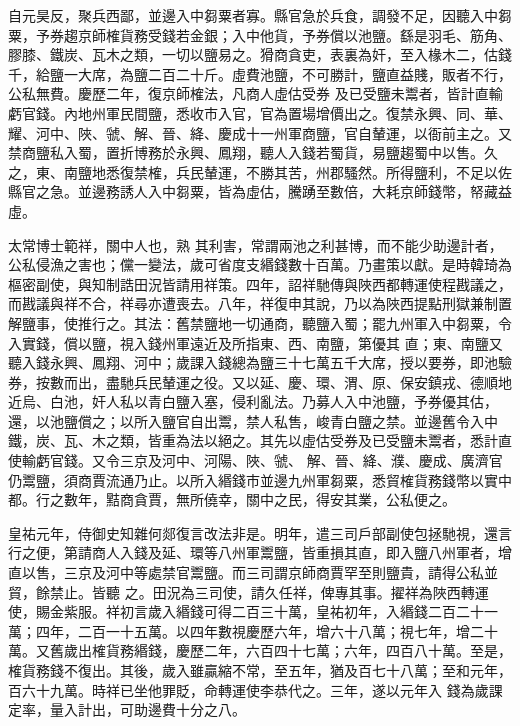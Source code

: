 \begin{pinyinscope}
 自元昊反，聚兵西鄙，並邊入中芻粟者寡。縣官急於兵食，調發不足，因聽入中芻粟，予券趨京師榷貨務受錢若金銀；入中他貨，予券償以池鹽。繇是羽毛、筋角、膠膝、鐵炭、瓦木之類，一切以鹽易之。猾商貪吏，表裏為奸，至入椽木二，估錢千，給鹽一大席，為鹽二百二十斤。虛費池鹽，不可勝計，鹽直益賤，販者不行，公私無費。慶歷二年，復京師榷法，凡商人虛估受券
 及已受鹽未鬻者，皆計直輸虧官錢。內地州軍民間鹽，悉收市入官，官為置場增價出之。復禁永興、同、華、耀、河中、陜、虢、解、晉、絳、慶成十一州軍商鹽，官自輦運，以衙前主之。又禁商鹽私入蜀，置折博務於永興、鳳翔，聽人入錢若蜀貨，易鹽趨蜀中以售。久之，東、南鹽地悉復禁榷，兵民輦運，不勝其苦，州郡騷然。所得鹽利，不足以佐縣官之急。並邊務誘人入中芻粟，皆為虛估，騰踴至數倍，大耗京師錢幣，帑藏益虛。



 太常博士範祥，關中人也，熟
 其利害，常謂兩池之利甚博，而不能少助邊計者，公私侵漁之害也；儻一變法，歲可省度支緡錢數十百萬。乃畫策以獻。是時韓琦為樞密副使，與知制誥田況皆請用祥策。四年，詔祥馳傳與陜西都轉運使程戡議之，而戡議與祥不合，祥尋亦遭喪去。八年，祥復申其說，乃以為陜西提點刑獄兼制置解鹽事，使推行之。其法：舊禁鹽地一切通商，聽鹽入蜀；罷九州軍入中芻粟，令入實錢，償以鹽，視入錢州軍遠近及所指東、西、南鹽，第優其
 直；東、南鹽又聽入錢永興、鳳翔、河中；歲課入錢總為鹽三十七萬五千大席，授以要券，即池驗券，按數而出，盡馳兵民輦運之役。又以延、慶、環、渭、原、保安鎮戎、德順地近烏、白池，奸人私以青白鹽入塞，侵利亂法。乃募人入中池鹽，予券優其估，還，以池鹽償之；以所入鹽官自出鬻，禁人私售，峻青白鹽之禁。並邊舊令入中鐵，炭、瓦、木之類，皆重為法以絕之。其先以虛估受券及已受鹽未鬻者，悉計直使輸虧官錢。又令三京及河中、河陽、陜、虢、
 解、晉、絳、濮、慶成、廣濟官仍鬻鹽，須商賈流通乃止。以所入緡錢市並邊九州軍芻粟，悉貿榷貨務錢幣以實中都。行之數年，黠商貪賈，無所僥幸，關中之民，得安其業，公私便之。



 皇祐元年，侍御史知雜何郯復言改法非是。明年，遣三司戶部副使包拯馳視，還言行之便，第請商人入錢及延、環等八州軍鬻鹽，皆重損其直，即入鹽八州軍者，增直以售，三京及河中等處禁官鬻鹽。而三司謂京師商賈罕至則鹽貴，請得公私並貿，餘禁止。皆聽
 之。田況為三司使，請久任祥，俾專其事。擢祥為陜西轉運使，賜金紫服。祥初言歲入緡錢可得二百三十萬，皇祐初年，入緡錢二百二十一萬；四年，二百一十五萬。以四年數視慶歷六年，增六十八萬；視七年，增二十萬。又舊歲出榷貨務緡錢，慶歷二年，六百四十七萬；六年，四百八十萬。至是，榷貨務錢不復出。其後，歲入雖贏縮不常，至五年，猶及百七十八萬；至和元年，百六十九萬。時祥已坐他罪貶，命轉運使李恭代之。三年，遂以元年入
 錢為歲課定率，量入計出，可助邊費十分之八。




\end{pinyinscope}
